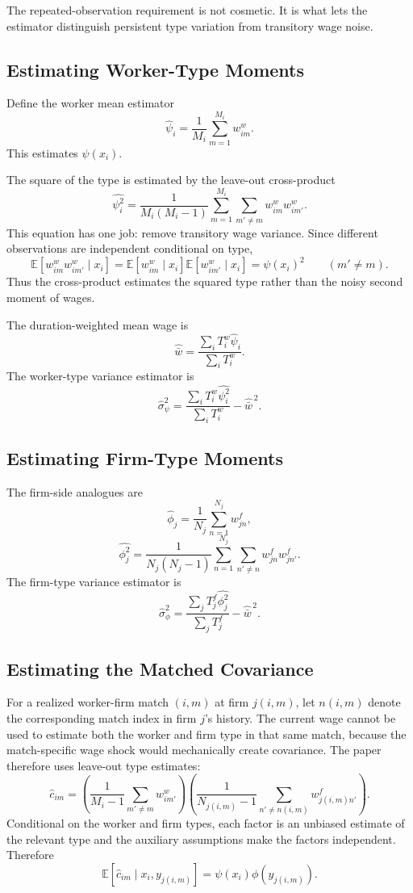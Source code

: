\documentclass[11pt]{article}
\newcommand{\E}{\mathbb{E}}
\begin{document}
The repeated-observation requirement is not cosmetic. It is what lets the estimator distinguish persistent type variation from transitory wage noise.

\subsection{Estimating Worker-Type Moments}

Define the worker mean estimator
\[
  \widehat\psi_i
  =
  \frac{1}{M_i}\sum_{m=1}^{M_i}w^w_{im}.
\]
This estimates $\psi(x_i)$.

The square of the type is estimated by the leave-out cross-product
\[
  \widehat{\psi_i^2}
  =
  \frac{1}{M_i(M_i-1)}
  \sum_{m=1}^{M_i}\sum_{m'\ne m}w^w_{im}w^w_{im'}.
\]
This equation has one job: remove transitory wage variance. Since different observations are independent conditional on type,
\[
  \E[w^w_{im}w^w_{im'}\mid x_i]
  =
  \E[w^w_{im}\mid x_i]\E[w^w_{im'}\mid x_i]
  =
  \psi(x_i)^2
  \qquad (m'\ne m).
\]
Thus the cross-product estimates the squared type rather than the noisy second moment of wages.

The duration-weighted mean wage is
\[
  \widehat{\bar w}
  =
  \frac{\sum_i T_i^w\widehat\psi_i}{\sum_i T_i^w}.
\]
The worker-type variance estimator is
\[
  \widehat\sigma_\psi^2
  =
  \frac{\sum_i T_i^w\widehat{\psi_i^2}}{\sum_i T_i^w}
  -
  \widehat{\bar w}^{\,2}.
\]

\subsection{Estimating Firm-Type Moments}

The firm-side analogues are
\[
  \widehat\phi_j
  =
  \frac{1}{N_j}\sum_{n=1}^{N_j}w^f_{jn},
\]
\[
  \widehat{\phi_j^2}
  =
  \frac{1}{N_j(N_j-1)}
  \sum_{n=1}^{N_j}\sum_{n'\ne n}w^f_{jn}w^f_{jn'}.
\]
The firm-type variance estimator is
\[
  \widehat\sigma_\phi^2
  =
  \frac{\sum_j T_j^f\widehat{\phi_j^2}}{\sum_j T_j^f}
  -
  \widehat{\bar w}^{\,2}.
\]

\subsection{Estimating the Matched Covariance}

For a realized worker-firm match $(i,m)$ at firm $j(i,m)$, let $n(i,m)$ denote the corresponding match index in firm $j$'s history. The current wage cannot be used to estimate both the worker and firm type in that same match, because the match-specific wage shock would mechanically create covariance. The paper therefore uses leave-out type estimates:
\[
  \widehat c_{im}
  =
  \left(
    \frac{1}{M_i-1}\sum_{m'\ne m}w^w_{im'}
  \right)
  \left(
    \frac{1}{N_{j(i,m)}-1}
    \sum_{n'\ne n(i,m)}w^f_{j(i,m)n'}
  \right).
\]
Conditional on the worker and firm types, each factor is an unbiased estimate of the relevant type and the auxiliary assumptions make the factors independent. Therefore
\[
  \E[\widehat c_{im}\mid x_i,y_{j(i,m)}]
  =
  \psi(x_i)\phi(y_{j(i,m)}).
\]
\end{document}
